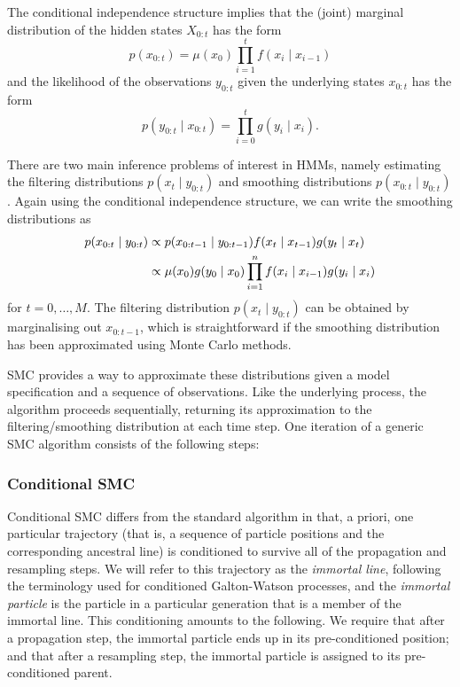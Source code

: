 \documentclass{article}
\begin{document}
The conditional independence structure implies that the (joint) marginal distribution of the hidden states $X_{0:t}$ has the form
\begin{equation} \label{eq:hmm_marginal}
p(x_{0:t}) = \mu(x_0) \prod_{i=1}^t f(x_i \mid x_{i-1})
\end{equation}
and the likelihood of the observations $y_{0:t}$ given the underlying states $x_{0:t}$ has the form
\begin{equation} \label{eq:hmm_likelihood}
p(y_{0:t} \mid x_{0:t}) = \prod_{i=0}^t g(y_i \mid x_i).
\end{equation}

There are two main inference problems of interest in HMMs, namely estimating the filtering distributions $p(x_t \mid y_{0:t})$ and smoothing distributions $p(x_{0:t} \mid y_{0:t})$. Again using the conditional independence structure, we can write the smoothing distributions as
\begin{align}
p(x_{0:t} \mid y_{0:t}) &\propto p(x_{0:t-1}\mid y_{0:t-1}) f(x_t\mid x_{t-1}) g(y_t \mid x_t) \label{eq:smooth_recursion}\\
&\propto \mu(x_0) g(y_0\mid x_0) \prod_{i=1}^n f(x_i \mid x_{i-1}) g(y_i\mid x_i) \notag
\end{align}
for $t = 0,\dots,M$. The filtering distribution $p(x_t \mid y_{0:t})$ can be obtained by marginalising out $x_{0:t-1}$, which is straightforward if the smoothing distribution has been approximated using Monte Carlo methods.

SMC provides a way to approximate these distributions given a model specification and a sequence of observations. Like the underlying process, the algorithm proceeds sequentially, returning its approximation to the filtering/smoothing distribution at each time step.
One iteration of a generic SMC algorithm consists of the following steps:


\subsubsection{Conditional SMC}
Conditional SMC differs from the standard algorithm in that, a priori, one particular trajectory (that is, a sequence of particle positions and the corresponding ancestral line) is conditioned to survive all of the propagation and resampling steps. We will refer to this trajectory as the \emph{immortal line}, following the terminology used for conditioned Galton-Watson processes, and the \emph{immortal particle} is the particle in a particular generation that is a member of the immortal line.
This conditioning amounts to the following. We require that after a propagation step, the immortal particle ends up in its pre-conditioned position; and that after a resampling step, the immortal particle is assigned to its pre-conditioned parent.
\end{document}
